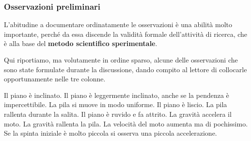 \subsubsection*{Osservazioni preliminari}
L'abitudine a documentare ordinatamente le osservazioni è una abilità molto importante, perché da essa discende la validità formale dell'attività di ricerca, che è alla base del {\bf metodo scientifico sperimentale}.\newline

Qui riportiamo, ma volutamente in ordine sparso, alcune delle osservazioni che sono state formulate durante la discussione, dando compito al lettore di collocarle opportunamente nelle tre colonne.\newline

Il piano è inclinato.\newline
Il piano è leggermente inclinato, anche se la pendenza è impercettibile.\newline
La pila si muove in modo uniforme.\newline
Il piano è liscio.\newline
La pila rallenta durante la salita.\newline
Il piano è ruvido e fa attrito.\newline
La gravità accelera il moto.\newline
La gravità rallenta la pila.\newline
La velocità del moto aumenta ma di pochissimo.\newline
Se la spinta iniziale è molto piccola si osserva una piccola accelerazione.\newline

